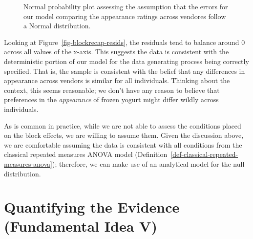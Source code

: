 \documentclass[
  letterpaper,
  DIV=11,
  numbers=noendperiod]{scrreprt}
\theoremstyle{plain}
\theoremstyle{definition}
\theoremstyle{definition}
\theoremstyle{remark}
\begin{document}
\begin{figure}


\caption{\label{fig-blockrecap-probplot}Normal probability plot
assessing the assumption that the errors for our model comparing the
appearance ratings across vendores follow a Normal distribution.}

\end{figure}%

Looking at Figure~\ref{fig-blockrecap-resids}, the residuals tend to
balance around 0 across all values of the x-axis. This suggests the data
is consistent with the deterministic portion of our model for the data
generating process being correctly specified. That is, the sample is
consistent with the belief that any differences in appearance across
vendors is similar for all individuals. Thinking about the context, this
seems reasonable; we don't have any reason to believe that preferences
in the \emph{appearance} of frozen yogurt might differ wildly across
individuals.

As is common in practice, while we are not able to assess the conditions
placed on the block effects, we are willing to assume them. Given the
discussion above, we are comfortable assuming the data is consistent
with all conditions from the classical repeated measures ANOVA model
(Definition~\ref{def-classical-repeated-measures-anova}); therefore, we
can make use of an analytical model for the null distribution.

\section{Quantifying the Evidence (Fundamental Idea
V)}\label{quantifying-the-evidence-fundamental-idea-v-2}
\end{document}
